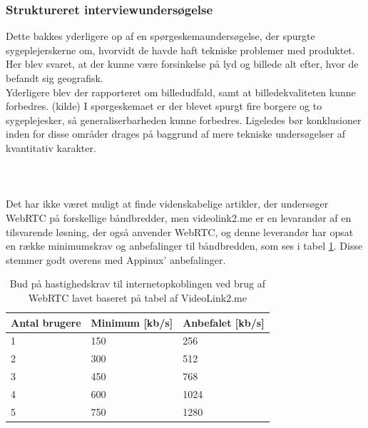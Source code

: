 \subsubsection{Struktureret interviewundersøgelse}
Dette bakkes yderligere op af en spørgeskemaundersøgelse, der spurgte sygeplejerskerne om, hvorvidt de havde haft tekniske problemer med produktet. Her blev svaret, at der kunne være forsinkelse på lyd og billede alt efter, hvor de befandt sig geografisk.\\Yderligere blev der rapporteret om billedudfald, samt at billedekvaliteten kunne forbedres. (kilde) I spørgeskemaet er der blevet spurgt fire borgere og to sygeplejesker, så generaliserbarheden kunne forbedres. Ligeledes bør konklusioner inden for disse områder drages på baggrund af mere tekniske undersøgelser af kvantitativ karakter.\\ \\
\\ \\
Det har ikke været muligt at finde videnskabelige artikler, der undersøger WebRTC på forskellige båndbredder, men videolink2.me er en levarandør af en tilsvarende løsning, der også anvender WebRTC, og denne leverandør har opsat en række minimumskrav og anbefalinger til båndbredden, som ses i tabel \ref{tab:hastighedtabel}. Disse stemmer godt overens med Appinux' anbefalinger.
\begin{table}[H]
\caption{Bud på hastighedskrav til internetopkoblingen ved brug af WebRTC lavet baseret på tabel af VideoLink2.me\cite{videolink2me}}
\label{tab:hastighedtabel}
\centering
\begin{tabular}{|l|l|l|}
\hline
\cellcolor{blue!25}\textbf{Antal brugere} & \cellcolor{blue!25}\textbf{Minimum} [kb/s]  & \cellcolor{blue!25}\textbf{Anbefalet}  [kb/s] \\ \hline
1             & 150          & 256          \\ \hline
2             & 300          & 512          \\ \hline
3             & 450          & 768          \\ \hline
4             & 600          & 1024          \\ \hline
5             & 750          & 1280          \\ \hline
\end{tabular}

\end{table}
